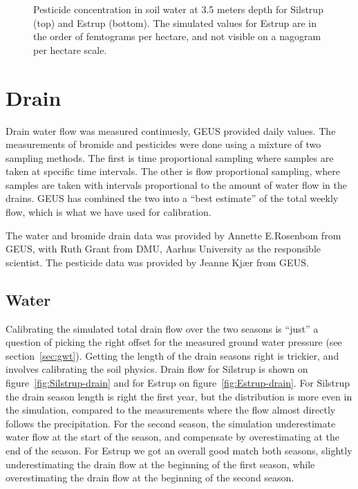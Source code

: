 \begin{figure}[htbp]
  \begin{center}
  \end{center}
  \caption{Pesticide concentration in soil water at 3.5 meters depth
    for Silstrup (top) and Estrup (bottom).  The simulated values for
    Estrup are in the order of femtograms per hectare, and not visible
    on a nagogram per hectare scale.}
  \label{fig:pest-horizontal}
\end{figure}

\FloatBarrier
\section{Drain}

Drain water flow was measured continuesly, GEUS provided daily values.
The measurements of bromide and pesticides were done using a mixture
of two sampling methods.  The first is time proportional sampling
where samples are taken at specific time intervals.  The other is flow
proportional sampling, where samples are taken with intervals
proportional to the amount of water flow in the drains.  GEUS has
combined the two into a ``best estimate'' of the total weekly flow,
which is what we have used for calibration.

The water and bromide drain data was provided by Annette E.\@ Rosenbom
from GEUS, with Ruth Grant from DMU, Aarhus University as the
responsible scientist.  The pesticide data was provided by Jeanne
Kj{\ae}r from GEUS.

\subsection{Water}

Calibrating the simulated total drain flow over the two seasons is
``just'' a question of picking the right offset for the measured
ground water pressure (see section~\ref{sec:gwt}).  Getting the length
of the drain seasons right is trickier, and involves calibrating the
soil physics.  Drain flow for Silstrup is shown on
figure~\ref{fig:Silstrup-drain} and for Estrup on
figure~\ref{fig:Estrup-drain}.  For Silstrup the drain season length
is right the first year, but the distribution is more even in the
simulation, compared to the measurements where the flow almost
directly follows the precipitation.  For the second season, the
simulation underestimate water flow at the start of the season, and
compensate by overestimating at the end of the season.  For Estrup we
got an overall good match both seasons, slightly underestimating the
drain flow at the beginning of the first season, while overestimating
the drain flow at the beginning of the second season.

